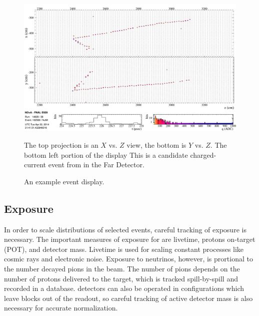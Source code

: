 \begin{figure}
\begin{center}
\includegraphics[width=\textwidth]{figures/evd/evd_numu_cand.png}
\end{center}
\caption{An example \nova event display.}{The top projection is an $X$ vs. $Z$
view, the bottom is $Y$ vs. $Z$.
The bottom left portion of the display
This is a candidate \numu charged-current event from in the Far Detector.}
\label{eventDisplay}
\end{figure}


\subsection{Exposure}


In order to scale distributions of selected events, careful tracking
of exposure is necessary.
The important measures of exposure for \nova are livetime,
protons on-target (POT), and detector mass.
Livetime is used for scaling constant processes
like cosmic rays and electronic noise.
Exposure to neutrinos, however, is prortional to the number decayed pions
in the \numi beam.
The number of pions depends on the number of protons delivered to the target,
which is tracked spill-by-spill and recorded in a database.
\nova detectors can also be operated in configurations which leave blocks
out of the readout, so careful tracking of active detector mass is also
necessary for accurate normalization.


